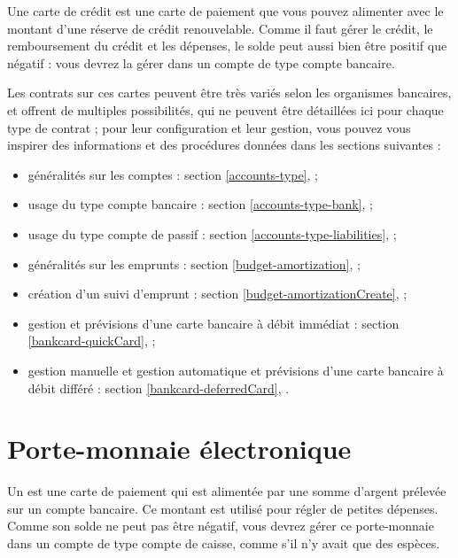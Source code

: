 Une carte de crédit est une carte de paiement que vous pouvez alimenter avec le montant d'une réserve de crédit renouvelable. Comme il faut gérer le crédit, le remboursement du crédit et les dépenses, le solde peut aussi bien être positif que négatif : vous devrez la gérer dans un compte de type compte bancaire.

Les contrats sur ces cartes peuvent être très variés selon les organismes bancaires, et offrent de multiples possibilités, qui ne peuvent être détaillées ici pour chaque type de contrat ; pour leur configuration et leur gestion, vous pouvez vous inspirer des informations et des procédures données dans les sections suivantes :

\begin{itemize}
	\item généralités sur les comptes : section \vref{accounts-type},  ;
	\item usage du type compte bancaire : section \vref{accounts-type-bank},  ;
	\item usage du type compte de passif : section \vref{accounts-type-liabilities},  ;
	\item généralités sur les emprunts : section \vref{budget-amortization},  ;
	\item création d'un suivi d'emprunt : section \vref{budget-amortizationCreate},  ;
	\item gestion et prévisions d'une carte bancaire à débit immédiat : section \vref{bankcard-quickCard},  ;
	\item gestion manuelle et gestion automatique et prévisions d'une carte bancaire à débit différé : section \vref{bankcard-deferredCard}, .
\end{itemize}


\section{Porte-monnaie électronique\label{bankcard-purse}}
 

Un  est une carte de paiement qui est alimentée par une somme d'argent prélevée sur un compte bancaire. Ce montant est utilisé pour régler de petites dépenses. Comme son solde ne peut pas être négatif, vous devrez gérer ce porte-monnaie dans un compte de type compte de caisse, comme s'il n'y avait que des espèces.


